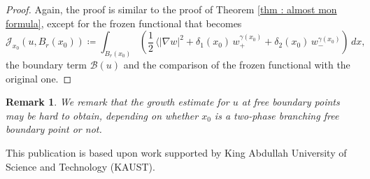\documentclass[reqno,11pt]{amsart}
\newtheorem{remark}{Remark}[section]
\newcommand{\1}{\mathds{1}}  %
\numberwithin{equation}{section}
\begin{document}
\begin{proof}
Again, the proof is similar to the proof of Theorem \ref{thm : almost mon formula}, except for the frozen functional that becomes
\[
	\mathcal{J}_{x_0}(u,B_r(x_0)) \coloneqq \int_{B_r(x_0)}\left( \frac{1}{2} \, \langle |\nabla w|^2 + \delta_1(x_0)\,w_+^{\gamma(x_0)} + \delta_2(x_0)\,w_-^{\gamma(x_0)} \right)\,dx,
\]
the boundary term $\mathcal{B}(u)$ and the comparison of the frozen functional with the original one. 
\end{proof}

\begin{remark}
We remark that the growth estimate for $u$ at free boundary points may be hard to obtain, depending on whether $x_0$ is a two-phase branching free boundary point or not.
\end{remark}

\bigskip

{\small {} This publication is based upon work supported by King Abdullah University of Science and Technology (KAUST).}

\medskip


\end{document}
